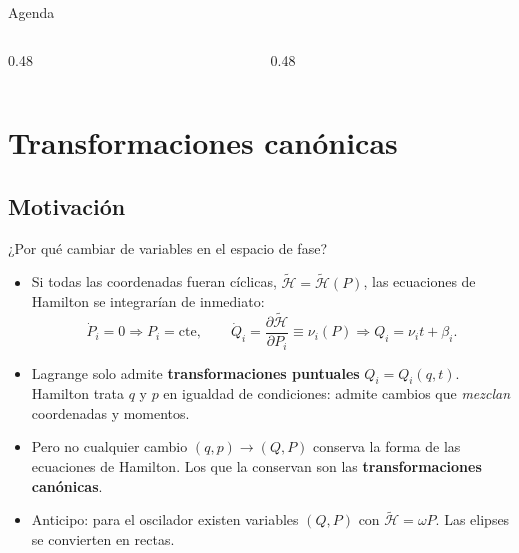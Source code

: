 \documentclass[spanish]{beamer}
\newcommand{\tH}{\tilde{\mathcal{H}}}        %
\newcommand{\pd}[2]{\frac{\partial #1}{\partial #2}}
\newcommand{\cte}{\text{cte}}
\begin{document}
\begin{frame}{Agenda}
\begin{columns}[T]
  \begin{column}{0.48\textwidth}
    \tableofcontents[sections={1-4},hideallsubsections]
  \end{column}
  \begin{column}{0.48\textwidth}
    \tableofcontents[sections={5-9},hideallsubsections]
  \end{column}
\end{columns}
\end{frame}

\section{Transformaciones canónicas}

\subsection{Motivación}
\begin{frame}{¿Por qué cambiar de variables en el espacio de fase?}
\begin{itemize}[<+->]
  \item Si todas las coordenadas fueran cíclicas, $\tH=\tH(P)$, las ecuaciones de
        Hamilton se integrarían de inmediato:
        \[
          \dot P_i=0\Rightarrow P_i=\cte,\qquad
          \dot Q_i=\pd{\tH}{P_i}\equiv\nu_i(P)\Rightarrow Q_i=\nu_i t+\beta_i .
        \]
  \item Lagrange solo admite \textbf{transformaciones puntuales} $Q_i=Q_i(q,t)$.
        Hamilton trata $q$ y $p$ en igualdad de condiciones: admite cambios que
        \emph{mezclan} coordenadas y momentos.
  \item Pero no cualquier cambio $(q,p)\to(Q,P)$ conserva la forma de las ecuaciones
        de Hamilton. Los que la conservan son las \textbf{transformaciones canónicas}.
  \item Anticipo: para el oscilador existen variables $(Q,P)$ con $\tH=\omega P$.
        Las elipses se convierten en rectas.
\end{itemize}
\end{frame}
\end{document}
